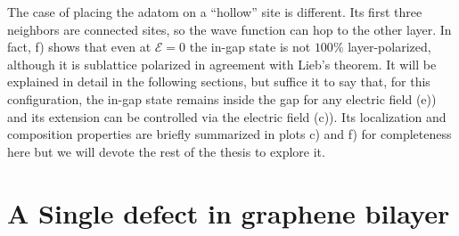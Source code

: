 \bigskip


The case of placing the adatom on a ``hollow'' site is different. Its first three neighbors are connected sites, so the wave function can hop to the other layer. In fact, f) shows that even at $\mathcal{E}=0$ the in-gap state is not $100\%$ layer-polarized, although it is sublattice polarized in agreement with Lieb's theorem.
It will be explained in detail in the following sections, but suffice it to say that, for this configuration, the in-gap state remains inside the gap for any electric field (e)) and its extension can be controlled via the electric field (c)).
Its localization and composition properties are briefly summarized in plots c) and f) for completeness here but we will devote the rest of the thesis to explore it.




\section{A Single defect in graphene bilayer}

